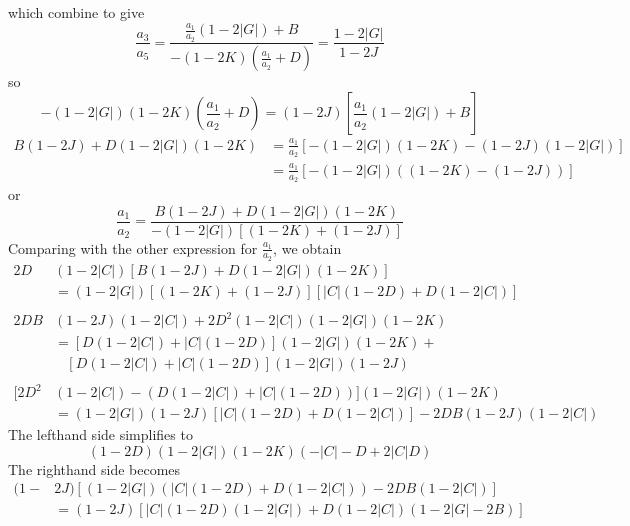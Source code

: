 which combine to give
\begin{equation*}
\frac{a_3}{a_5}
= \frac{\frac{a_1}{a_2}(1-2|G|) + B}{-(1-2K)(\frac{a_1}{a_2} + D)}
= \frac{1-2|G|}{1-2J}
\end{equation*}
so
\begin{equation*}
-(1-2|G|)(1-2K)\left(\frac{a_1}{a_2}        +D\right) =
 (1-2 J )      \left[\frac{a_1}{a_2}(1-2|G|)+B\right]
\end{equation*}
\begin{align*}
B(1\!-\!2J)\!+\!D(1\!-\!2|G|)(1\!-\!2K) &= \frac{a_1}{a_2}[-(1\!-\!2|G|)(1\!-\!2K)\!-\!(1\!-\!2J)(1\!-\!2|G|)] \\
                        &= \frac{a_1}{a_2}[-(1\!-\!2|G|)((1\!-\!2K)\!-\!(1\!-\!2J))]
\end{align*}
or
\begin{equation*}
\frac{a_1}{a_2} = \frac{B(1-2J)+D(1-2|G|)(1-2K)}{-(1-2|G|)[(1-2K)+(1-2J)]}
\end{equation*}
Comparing with the other expression for $\frac{a_1}{a_2}$, we obtain
\begin{align*}
  2D &(1-2|C|)[B(1-2J)+D(1-2|G|)(1-2K)]                           \\
     &= (1-2|G|)[(1-2K)+(1-2J)][|C|(1-2D)+D(1-2|C|)]              \\
     &~                                                           \\
  2DB&(1-2J)(1-2|C|)+2D^2(1-2|C|)(1-2|G|)(1-2K)                   \\
     &=    [D(1-2|C|)+|C|(1-2D)](1-2|G|)(1-2K) +                  \\
     &~~~~ [D(1-2|C|)+|C|(1-2D)](1-2|G|)(1-2J)                    \\
     &~                                                           \\
[2D^2&(1-2|C|)-(D(1-2|C|)+|C|(1-2D))](1-2|G|)(1-2K)               \\
     &= (1\!-\!2|G|)(1\!-\!2J)[|C|(1\!-\!2D)\!+\!D(1\!-\!2|C|)]\!
      - \!2DB(1\!-\!2J)(1\!-\!2|C|)
\end{align*}
The lefthand side simplifies to
\begin{equation*}
(1-2D)(1-2|G|)(1-2K)(-|C|-D+2|C|D)
\end{equation*}
The righthand side becomes
\begin{align*}
(1-&2J)[(1-2|G|)(|C|(1-2D)+D(1-2|C|))-2DB(1-2|C|)] \\
   &= (1-2J)[|C|(1-2D)(1-2|G|)+D(1-2|C|)(1-2|G|-2B)]
\end{align*}
